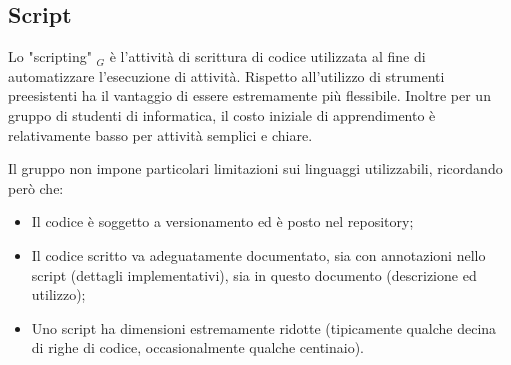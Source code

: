 \subsection{Script}
Lo "scripting" $_G$ è l'attività di scrittura di codice utilizzata al fine di automatizzare l'esecuzione di attività. Rispetto all'utilizzo di strumenti preesistenti ha il vantaggio di essere estremamente più flessibile. Inoltre per un gruppo di studenti di informatica, il costo iniziale di apprendimento è relativamente basso per attività semplici e chiare.

Il gruppo non impone particolari limitazioni sui linguaggi utilizzabili, ricordando però che:
\begin{itemize}
    \item Il codice è soggetto a versionamento ed è posto nel repository;
    \item Il codice scritto va adeguatamente documentato, sia con annotazioni nello script (dettagli implementativi), sia in questo documento (descrizione ed utilizzo);
    \item Uno script ha dimensioni estremamente ridotte (tipicamente qualche decina di righe di codice, occasionalmente qualche centinaio).
\end{itemize}


